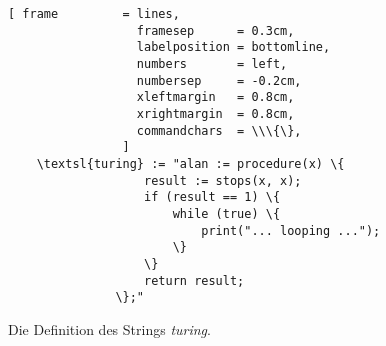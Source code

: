 \begin{figure}[!h]
  \centering
\begin{Verbatim}[ frame         = lines, 
                  framesep      = 0.3cm, 
                  labelposition = bottomline,
                  numbers       = left,
                  numbersep     = -0.2cm,
                  xleftmargin   = 0.8cm,
                  xrightmargin  = 0.8cm,
                  commandchars  = \\\{\},
                ]
    \textsl{turing} := "alan := procedure(x) \{
                   result := stops(x, x);
                   if (result == 1) \{
                       while (true) \{
                           print("... looping ...");
                       \}
                   \}
                   return result;
               \};"
\end{Verbatim}
  \vspace*{-0.3cm}
  \caption{Die Definition des Strings \textsl{turing}.}
  \label{fig:turing-string}
\end{figure}

